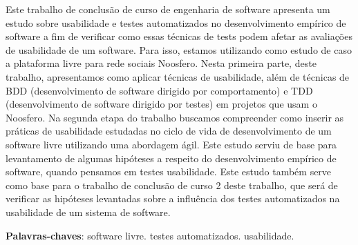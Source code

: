 \begin{resumo}

Este trabalho de conclusão de curso de engenharia de software apresenta um estudo sobre usabilidade e testes automatizados no desenvolvimento empírico de software a fim de verificar como essas técnicas de tests podem afetar as avaliações de usabilidade de um software. Para isso, estamos utilizando como estudo de caso a plataforma livre para rede sociais Noosfero. Nesta primeira parte, deste trabalho, apresentamos como aplicar técnicas de usabilidade, além de técnicas de BDD (desenvolvimento de software dirigido por comportamento) e TDD (desenvolvimento de software dirigido por testes) em projetos que usam o Noosfero.  Na segunda etapa do trabalho buscamos compreender como inserir as práticas de usabilidade estudadas no ciclo de vida de desenvolvimento de um software livre utilizando uma abordagem ágil. 
Este estudo serviu de base para levantamento de algumas hipóteses a respeito do desenvolvimento empírico de software, quando pensamos em testes usabilidade. Este estudo também serve como base para o trabalho de conclusão de curso 2 deste trabalho, que será de verificar as hipóteses levantadas sobre a influência dos testes automatizados na usabilidade de um sistema de software.


\vspace{\onelineskip}
    
 \noindent
 \textbf{Palavras-chaves}: software livre. testes automatizados. usabilidade.

\end{resumo}

